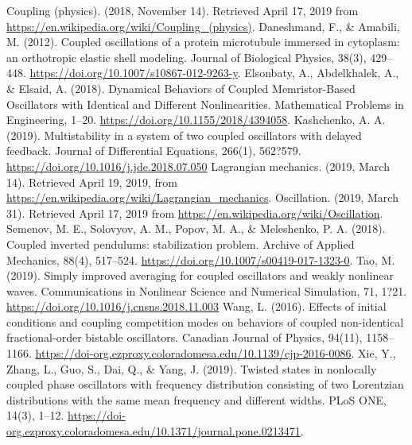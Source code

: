 \documentclass[twocolumn]{article}
\begin{document}
\begin{thebibliography}{99}
Coupling (physics). (2018, November 14). Retrieved April 17, 2019 from \url{https://en.wikipedia.org/wiki/Coupling_(physics)}.
Daneshmand, F., \& Amabili, M. (2012). Coupled oscillations of a protein microtubule immersed in cytoplasm: an orthotropic elastic shell modeling. Journal of Biological Physics, 38(3), 429–448. \url{https://doi.org/10.1007/s10867-012-9263-y}.
Elsonbaty, A., Abdelkhalek, A., \& Elsaid, A. (2018). Dynamical Behaviors of Coupled Memristor-Based Oscillators with Identical and Different Nonlinearities. Mathematical Problems in Engineering, 1–20. \url{https://doi.org/10.1155/2018/4394058}.
Kashchenko, A. A. (2019). Multistability in a system of two coupled oscillators with delayed feedback. Journal of Differential Equations, 266(1), 562?579. \url{https://doi.org/10.1016/j.jde.2018.07.050}
Lagrangian mechanics. (2019, March 14). Retrieved April 19, 2019, from \url{https://en.wikipedia.org/wiki/Lagrangian_mechanics}.
Oscillation. (2019, March 31). Retrieved April 17, 2019 from \url{https://en.wikipedia.org/wiki/Oscillation}.
Semenov, M. E., Solovyov, A. M., Popov, M. A., \& Meleshenko, P. A. (2018). Coupled inverted pendulums: stabilization problem. Archive of Applied Mechanics, 88(4), 517–524. \url{https://doi.org/10.1007/s00419-017-1323-0}.
Tao, M. (2019). Simply improved averaging for coupled oscillators and weakly nonlinear waves. Communications in Nonlinear Science and Numerical Simulation, 71, 1?21. \url{https://doi.org/10.1016/j.cnsns.2018.11.003}
Wang, L. (2016). Effects of initial conditions and coupling competition modes on behaviors of coupled non-identical fractional-order bistable oscillators. Canadian Journal of Physics, 94(11), 1158–1166. \url{https://doi-org.ezproxy.coloradomesa.edu/10.1139/cjp-2016-0086}.
Xie, Y., Zhang, L., Guo, S., Dai, Q., \& Yang, J. (2019). Twisted states in nonlocally coupled phase oscillators with frequency distribution consisting of two Lorentzian distributions with the same mean frequency and different widths. PLoS ONE, 14(3), 1–12. \url{https://doi-org.ezproxy.coloradomesa.edu/10.1371/journal.pone.0213471}.
\end{thebibliography}
\end{document}
